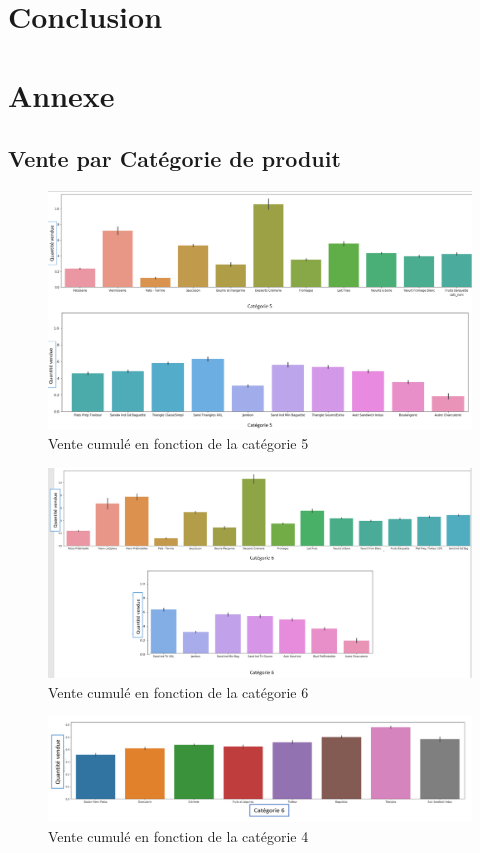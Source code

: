\documentclass{article} %
\begin{document}
\section{Conclusion}

\newpage
\section{Annexe}
\subsection{Vente par Catégorie de produit}
\label{sec:catprod}
\begin{figure}[!h]
	\centering
	\includegraphics[keepaspectratio = true,scale=0.65]{categorie.png}
	\caption{Vente cumulé en fonction de la catégorie 5}
\end{figure}

\begin{figure}[!h]
	\centering 
	\includegraphics[keepaspectratio = true,scale=0.55]{categorie6.png}
	\caption{Vente cumulé en fonction de la catégorie 6}
	\label{bb3}
\end{figure}
\newpage
\begin{figure}[!h]
	\centering
	\includegraphics[keepaspectratio = true,scale=0.55]{categorie4.png}
	\caption{Vente cumulé en fonction de la catégorie 4}
	\label{bb3}
\end{figure}
\end{document}
